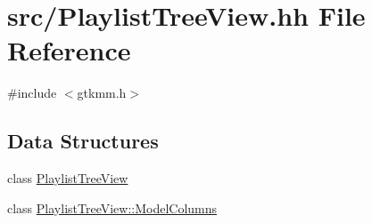 \hypertarget{PlaylistTreeView_8hh}{
\section{src/\-Playlist\-Tree\-View.hh \-File \-Reference}
\label{PlaylistTreeView_8hh}
}
{\ttfamily \#include $<$gtkmm.\-h$>$}\*
\subsection*{\-Data \-Structures}
\begin{DoxyCompactItemize}
\item 
class \hyperlink{classPlaylistTreeView}{\-Playlist\-Tree\-View}
\item 
class \hyperlink{classPlaylistTreeView_1_1ModelColumns}{\-Playlist\-Tree\-View\-::\-Model\-Columns}
\end{DoxyCompactItemize}
